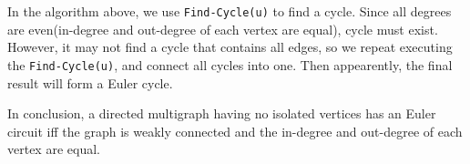 \documentclass[a4paper,11pt]{article}
\begin{document}
\begin{spacing}{1.4}
    \hspace{2em}
    In the algorithm above, we use \verb|Find-Cycle(u)| to 
    find a cycle. Since all degrees are even(in-degree and out-degree 
    of each vertex are equal), cycle must exist.
    However, it may not find a cycle that contains all edges, 
    so we repeat executing the \verb|Find-Cycle(u)|, and 
    connect all cycles into one. Then appearently, 
    the final result will form a Euler cycle.

    \hspace{2em}
    In conclusion, a directed multigraph having no isolated vertices
    has an Euler circuit iff the graph is weakly connected and the 
    in-degree and out-degree of each vertex are equal.


    \end{spacing}
\end{document}

